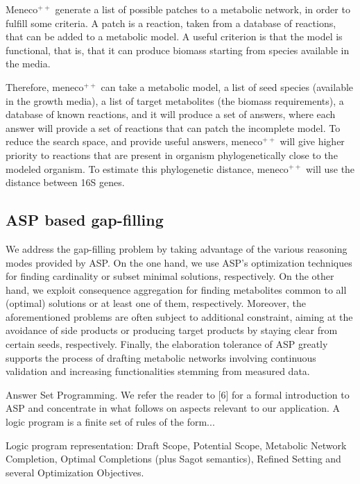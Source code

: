 \documentclass{article}
\newcommand{\Meneco}{Meneco$^{++}$\xspace}
\newcommand{\meneco}{meneco$^{++}$\xspace}
\begin{document}
\Meneco generate a list of possible patches to a metabolic network, in order to fulfill some criteria.
A patch is a reaction, taken from a database of reactions, that can be added to a metabolic model.
A useful criterion is that the model is functional, that is, that it can produce biomass starting from species available in the media.

Therefore, \meneco can take a metabolic model, a list of seed species (available in the growth media), a list of target metabolites (the biomass requirements), a database of known reactions, and it will produce a set of answers, where each answer will provide a set of reactions that can patch the incomplete model.
To reduce the search space, and provide useful answers, \meneco will give higher priority to reactions that are present in organism phylogenetically close to the modeled organism. To estimate this phylogenetic distance, \meneco will use the distance between 16S genes.


\subsection{ASP based gap-filling}

We address the gap-filling problem by taking advantage of the various reasoning modes provided by ASP. On the one hand, we use ASP’s optimization techniques for finding cardinality or subset minimal solutions, respectively. On the other hand, we exploit consequence aggregation for finding metabolites common to all (optimal) solutions or at least one of them, respectively. Moreover, the aforementioned problems are often subject to additional constraint, aiming at the avoidance of side products or producing target products by staying clear from certain seeds, respectively. Finally, the elaboration tolerance of ASP greatly supports the process of drafting metabolic networks involving continuous validation and increasing functionalities stemming from measured data.

Answer Set Programming. We refer the reader to [6] for a formal introduction to ASP and concentrate in what follows on aspects relevant to our application. A logic program is a finite set of rules of the form...

Logic program representation: Draft Scope, Potential Scope, Metabolic Network Completion, Optimal Completions (plus Sagot semantics), Refined Setting and several Optimization Objectives.
\end{document}
